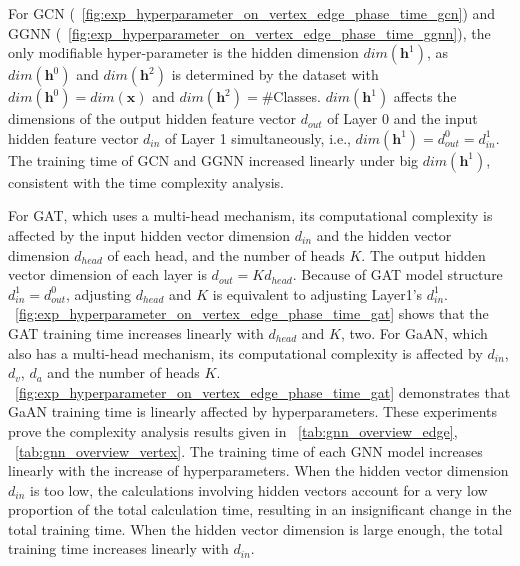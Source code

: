 For GCN (\figurename~\ref{fig:exp_hyperparameter_on_vertex_edge_phase_time_gcn}) and GGNN (\figurename~\ref{fig:exp_hyperparameter_on_vertex_edge_phase_time_ggnn}), the only modifiable hyper-parameter is the hidden dimension $dim(\boldsymbol{h}^1)$, as $dim(\boldsymbol{h}^0)$ and $dim(\boldsymbol{h}^2)$ is determined by the dataset with $dim(\boldsymbol{h}^0)=dim(\boldsymbol{x})$ and $dim(\boldsymbol{h}^2)=$\#Classes.
$dim(\boldsymbol{h}^1)$ affects the dimensions of the output hidden feature vector $d_{out}$ of Layer 0 and the input hidden feature vector $d_{in}$ of Layer 1 simultaneously, i.e., $dim(\boldsymbol{h}^1) = d^0_{out} = d^1_{in}$.
The training time of GCN and GGNN increased linearly under big $dim(\boldsymbol{h}^1)$, consistent with the time complexity analysis.

For GAT,  which uses a multi-head mechanism, its computational complexity is affected by the input hidden vector dimension $d_{in}$ and the hidden vector dimension $d_{head}$ of each head, and the number of heads $K$.
The output hidden vector dimension of each layer is $d_{out}=K d_{head}$.
Because of GAT model structure $d^1_{in}=d^0_{out}$, adjusting $d_{head}$ and $K$ is equivalent to adjusting Layer1’s $d^1_{in}$.
\figurename~\ref{fig:exp_hyperparameter_on_vertex_edge_phase_time_gat} shows that the GAT training time increases linearly with $d_{head}$ and $K$, two.
For GaAN, which also has a multi-head mechanism, its computational complexity is affected by $d_{in}$, $d_v$, $d_a$ and the number of heads $K$.
\figurename~\ref{fig:exp_hyperparameter_on_vertex_edge_phase_time_gat} demonstrates that GaAN training time is linearly affected by hyperparameters.
These experiments prove the complexity analysis results given in \tablename~\ref{tab:gnn_overview_edge}, \tablename~\ref{tab:gnn_overview_vertex}. 
The training time of each GNN model increases linearly with the increase of hyperparameters.
When the hidden vector dimension $d_{in}$ is too low, the calculations involving hidden vectors account for a very low proportion of the total calculation time,
resulting in an insignificant change in the total training time.
When the hidden vector dimension is large enough, the total training time increases linearly with $d_{in}$.

